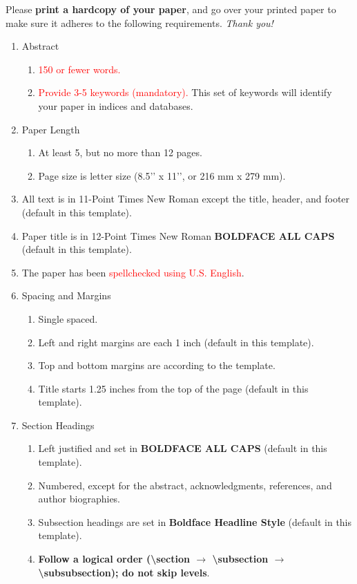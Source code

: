 \documentclass{scspaperproc}
\theoremstyle{scsthe}
\begin{document}
Please \textbf{print a hardcopy of your paper}, and go over your printed paper to make sure it adheres to the following requirements. \textit{Thank you!}
\begin{enumerate}
	\item Abstract
  \begin{enumerate}
	  \item \textcolor{red}{150 or fewer words.}
	  \item \textcolor{red}{Provide 3-5 keywords (mandatory).} This set of keywords will identify your paper in indices and databases.
	\end{enumerate}
	\item Paper Length
  \begin{enumerate}
	  \item At least 5, but no more than 12 pages.
	  \item Page size is letter size (8.5’’ x 11’’, or 216 mm x 279 mm).
	\end{enumerate}
	\item All text is in 11-Point Times New Roman except the title, header, and footer (default in this template).
	\item Paper title is in 12-Point Times New Roman \textbf{BOLDFACE ALL CAPS} (default in this template).
	\item The paper has been \textcolor{red}{spellchecked using U.S. English}. 
	\item Spacing and Margins
  \begin{enumerate}
	  \item Single spaced.
	  \item Left and right margins are each 1 inch (default in this template).
	  \item Top and bottom margins are according to the template.
	  \item Title starts 1.25 inches from the top of the page (default in this template).
	\end{enumerate}
	\item Section Headings
  \begin{enumerate}
	  \item Left justified and set in \textbf{BOLDFACE ALL CAPS} (default in this template).
	  \item Numbered, except for the abstract, acknowledgments, references, and author biographies.
	  \item Subsection headings are set in \textbf{Boldface Headline Style} (default in this template).
    \item \textbf{Follow a logical order (\textbackslash section $\rightarrow$ \textbackslash subsection $\rightarrow$ \textbackslash subsubsection); do    not skip levels}.

\end{enumerate}
\end{enumerate}
\end{document}
